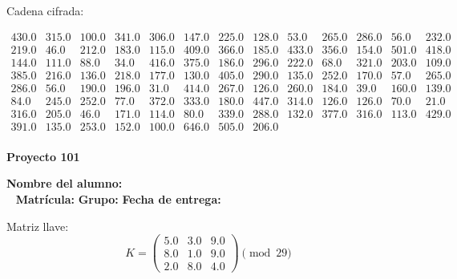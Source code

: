\documentclass[12pt]{article}
\begin{document}
Cadena cifrada:
\begin{center}
$\begin{array}{lllllllllllll}
430.0 & 315.0 & 100.0 & 341.0 & 306.0 & 147.0 & 225.0 & 128.0 & 53.0 & 265.0 & 286.0 & 56.0 & 232.0\\
219.0 & 46.0 & 212.0 & 183.0 & 115.0 & 409.0 & 366.0 & 185.0 & 433.0 & 356.0 & 154.0 & 501.0 & 418.0\\
144.0 & 111.0 & 88.0 & 34.0 & 416.0 & 375.0 & 186.0 & 296.0 & 222.0 & 68.0 & 321.0 & 203.0 & 109.0\\
385.0 & 216.0 & 136.0 & 218.0 & 177.0 & 130.0 & 405.0 & 290.0 & 135.0 & 252.0 & 170.0 & 57.0 & 265.0\\
286.0 & 56.0 & 190.0 & 196.0 & 31.0 & 414.0 & 267.0 & 126.0 & 260.0 & 184.0 & 39.0 & 160.0 & 139.0\\
84.0 & 245.0 & 252.0 & 77.0 & 372.0 & 333.0 & 180.0 & 447.0 & 314.0 & 126.0 & 126.0 & 70.0 & 21.0\\
316.0 & 205.0 & 46.0 & 171.0 & 114.0 & 80.0 & 339.0 & 288.0 & 132.0 & 377.0 & 316.0 & 113.0 & 429.0\\
391.0 & 135.0 & 253.0 & 152.0 & 100.0 & 646.0 & 505.0 & 206.0\\
\end{array}$
\end{center}

\newpage


\textbf{Proyecto 101}

\textbf{Nombre del alumno:} \underline{\hspace{13cm}}\\\
\vspace{1cm}
\textbf{Matrícula:} \underline{\hspace{4cm}} \hspace{1cm}
\textbf{Grupo:} \underline{\hspace{2cm}}
\textbf{Fecha de entrega:} \underline{\hspace{2cm}}

\medskip

Matriz llave:
\[
K = \begin{pmatrix}
5.0 & 3.0 & 9.0\\
8.0 & 1.0 & 9.0\\
2.0 & 8.0 & 4.0
\end{pmatrix} \pmod{29}
\]
\end{document}
